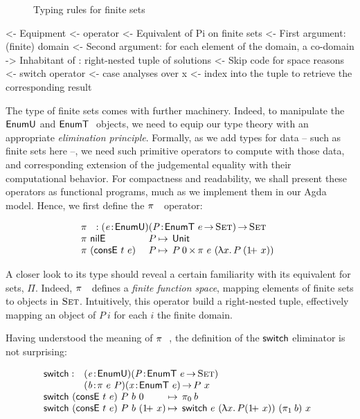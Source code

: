 \begin{figure}



\caption{Typing rules for finite sets}
\label{fig:typing-finite-set}

\end{figure}


\begin{wstructure}
<- Equipment
    <- \spi operator
        <- Equivalent of Pi on finite sets
        <- First argument: (finite) domain
        <- Second argument: for each element of the domain, a co-domain
        -> Inhabitant of \spi: right-nested tuple of solutions
            <- Skip code for space reasons
    <- switch operator
        <- case analyses over x
        <- index into the \spi tuple to retrieve the corresponding result
\end{wstructure}

The type of finite sets comes with further machinery. Indeed, to
manipulate the $\EnumU$ and $\EnumT{}$ objects, we need to equip our
type theory with an appropriate \emph{elimination
  principle}. Formally, as we add types for data -- such as finite
sets here --, we need such primitive operators to compute with those
data, and corresponding extension of the judgemental equality with
their computational behavior. For compactness and readability, we
shall present these operators as functional programs, much as we
implement them in our Agda model. Hence, we first define the
$\spi{}{}$ operator:

\[\stk{
\spi{}{} : \PITEL{\V{e}}{\EnumU}
           \PITEL{\V{P}}{\EnumT{e} \To \Set} \To \Set \\
\begin{array}{@{}ll@{\:\mapsto\:\:}l}
\spi{\NilE}{& P}        & \Unit \\
\spi{(\ConsE{t}{e})}{& P} & \TIMES{P\: \Ze}{\spi{e}{(\LAM{x} P\: (\Su{x}))}}
\end{array}
}\]

A closer look to its type should reveal a certain familiarity with its
equivalent for sets, $\Pi$. Indeed, $\spi{}{}$ defines a \emph{finite
  function space}, mapping elements of finite sets to objects in
$\Set$. Intuitively, this operator build a right-nested tuple,
effectively mapping an object of $P\:i$ for each $i$ the finite
domain.

Having understood the meaning of $\spi{}{}$, the definition of the
$\F{switch}$ eliminator is not surprising:

\[\stk{
\begin{array}{@{}ll}
\F{switch} : & \PITEL{\V{e}}{\EnumU}
               \PITEL{\V{P}}{\EnumT{e} \To \Set} \\
             & \PITEL{\V{b}}{\spi{e}{P}}
               \PITEL{\V{x}}{\EnumT{e}} \To P~x
\end{array} \\
\begin{array}{@{}l@{\:\mapsto\:\:}l}
\switch{(\ConsE{t}{e})}{P}{b}{\Ze}      & \fst{b} \\
\switch{(\ConsE{t}{e})}{P}{b}{(\Su{x})} & \switch{e}{(\LAM{x} P
  (\Su{x}))}{(\snd{b})}{x}
\end{array}
}\]

